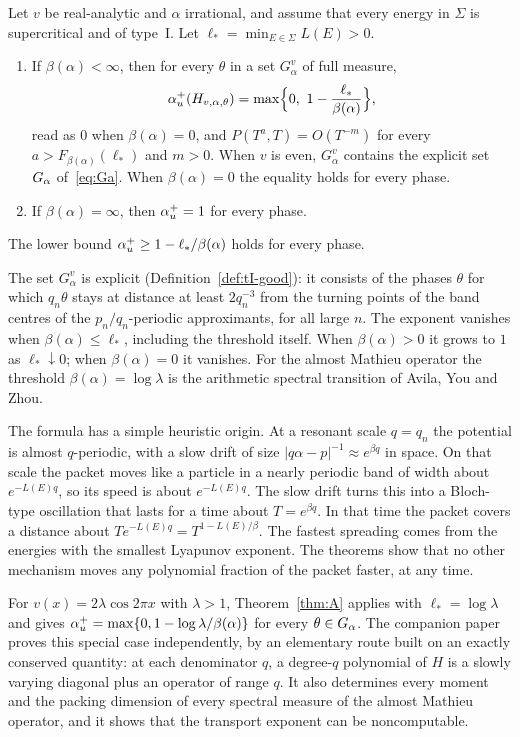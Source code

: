 \begin{maintheorem}\label{thm:A}
Let $v$ be real-analytic and $\alpha$ irrational, and assume that every energy in $\Sigma$ is supercritical and of type~I. Let $\ell_*=\min_{E\in\Sigma}L(E)>0$.
\begin{enumerate}
\item If $\beta(\alpha)<\infty$, then for every $\theta$ in a set $G^v_\alpha$ of full measure,
\[
\au(H_{v,\alpha,\theta})=\max\Bigl\{0,\ 1-\frac{\ell_*}{\beta(\alpha)}\Bigr\},
\]
read as $0$ when $\beta(\alpha)=0$, and $P(T^a,T)=O(T^{-m})$ for every $a>F_{\beta(\alpha)}(\ell_*)$ and $m>0$. When $v$ is even, $G^v_\alpha$ contains the explicit set $G_\alpha$ of~\eqref{eq:Ga}. When $\beta(\alpha)=0$ the equality holds for every phase.
\item If $\beta(\alpha)=\infty$, then $\alpha_u^+=1$ for every phase.
\end{enumerate}
The lower bound $\alpha_u^+\ge1-\ell_*/\beta(\alpha)$ holds for every phase.
\end{maintheorem}

The set $G^v_\alpha$ is explicit (Definition~\ref{def:tI-good}): it consists of the phases $\theta$ for which $q_n\theta$ stays at distance at least $2q_n^{-3}$ from the turning points of the band centres of the $p_n/q_n$-periodic approximants, for all large $n$. The exponent vanishes when $\beta(\alpha)\le\ell_*$, including the threshold itself. When $\beta(\alpha)>0$ it grows to $1$ as $\ell_*\downarrow0$; when $\beta(\alpha)=0$ it vanishes. For the almost Mathieu operator the threshold $\beta(\alpha)=\log\lambda$ is the arithmetic spectral transition of Avila, You and Zhou.

The formula has a simple heuristic origin. At a resonant scale $q=q_n$ the potential is almost $q$-periodic, with a slow drift of size $|q\alpha-p|^{-1}\approx e^{\beta q}$ in space. On that scale the packet moves like a particle in a nearly periodic band of width about $e^{-L(E)q}$, so its speed is about $e^{-L(E)q}$. The slow drift turns this into a Bloch-type oscillation that lasts for a time about $T=e^{\beta q}$. In that time the packet covers a distance about $Te^{-L(E)q}=T^{1-L(E)/\beta}$. The fastest spreading comes from the energies with the smallest Lyapunov exponent. The theorems show that no other mechanism moves any polynomial fraction of the packet faster, at any time.

\begin{remark}\label{rem:amo}
For $v(x)=2\lambda\cos2\pi x$ with $\lambda>1$, Theorem~\ref{thm:A} applies with $\ell_*=\log\lambda$ and gives $\alpha_u^+=\max\{0,1-\log\lambda/\beta(\alpha)\}$ for every $\theta\in G_\alpha$. The companion paper~\cite{DMamo} proves this special case independently, by an elementary route built on an exactly conserved quantity: at each denominator $q$, a degree-$q$ polynomial of $H$ is a slowly varying diagonal plus an operator of range $q$. It also determines every moment and the packing dimension of every spectral measure of the almost Mathieu operator, and it shows that the transport exponent can be noncomputable.
\end{remark}

